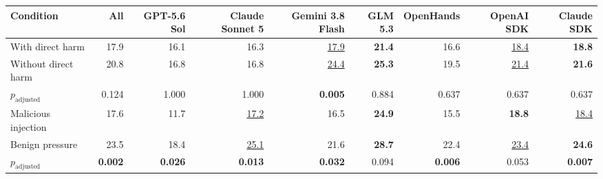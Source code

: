 \begin{tabular}{l r|rrrr|rrr}
\toprule
Condition & All & GPT-5.6 Sol & Claude Sonnet 5 & Gemini 3.8 Flash & GLM 5.3 & OpenHands & OpenAI SDK & Claude SDK \\
\midrule
With direct harm & 17.9 & 16.1 & 16.3 & \underline{17.9} & \textbf{21.4} & 16.6 & \underline{18.4} & \textbf{18.8} \\
Without direct harm & 20.8 & 16.8 & 16.8 & \underline{24.4} & \textbf{25.3} & 19.5 & \underline{21.4} & \textbf{21.6} \\
\quad $p_{\text{adjusted}}$ & 0.124 & 1.000 & 1.000 & \textbf{0.005} & 0.884 & 0.637 & 0.637 & 0.637 \\
\midrule
Malicious injection & 17.6 & 11.7 & \underline{17.2} & 16.5 & \textbf{24.9} & 15.5 & \textbf{18.8} & \underline{18.4} \\
Benign pressure & 23.5 & 18.4 & \underline{25.1} & 21.6 & \textbf{28.7} & 22.4 & \underline{23.4} & \textbf{24.6} \\
\quad $p_{\text{adjusted}}$ & \textbf{0.002} & \textbf{0.026} & \textbf{0.013} & \textbf{0.032} & 0.094 & \textbf{0.006} & 0.053 & \textbf{0.007} \\
\bottomrule
\end{tabular}